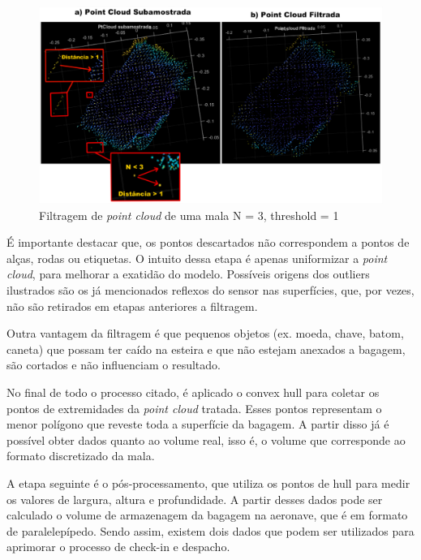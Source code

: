         \begin{figure}[h]
           \centering
           \includegraphics[width=1\textwidth]{imagens/FiltragemPtCloud.png}
           \caption{Filtragem de \textit{point cloud} de uma mala N = 3, threshold = 1}
          \label{fig:imagens/FiltragemPtCloud}
        \end{figure}

    É importante destacar que, os pontos descartados não correspondem a pontos de alças, rodas ou etiquetas. O intuito dessa etapa é apenas uniformizar a \textit{point cloud}, para melhorar a exatidão do modelo. Possíveis origens dos outliers ilustrados são os já mencionados reflexos do sensor nas superfícies, que, por vezes, não são retirados em etapas anteriores a filtragem. 
    
    Outra vantagem da filtragem é que pequenos objetos (ex. moeda, chave, batom, caneta) que possam ter caído na esteira e que não estejam anexados a bagagem, são cortados e não influenciam o resultado.

    
    
    No final de todo o processo citado, é aplicado o convex hull para coletar os pontos de extremidades da \textit{point cloud} tratada. Esses pontos representam o menor polígono que reveste toda a superfície da bagagem. A partir disso já é possível obter dados quanto ao volume real, isso é, o volume que corresponde ao formato discretizado da mala.
    
    A etapa seguinte é o pós-processamento, que utiliza os pontos de hull para medir os valores de largura, altura e profundidade. A partir desses dados pode ser calculado o volume de armazenagem da bagagem na aeronave, que é em formato de paralelepípedo. Sendo assim, existem dois dados que podem ser utilizados para aprimorar o processo de check-in e despacho.
    
